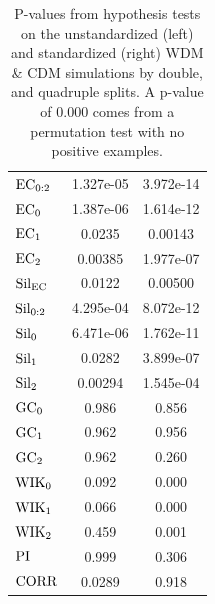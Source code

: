 \documentclass[12pt]{article}
\begin{document}
\begin{table}[htp!]
\begin{center}
\begin{tabular}{ l | c |  c }
          $\textup{EC}_{0:2}$ & 1.327e-05 &  3.972e-14 \\
          $\textup{EC}_{0}$ & 1.387e-06 & 1.614e-12 \\
          $\textup{EC}_{1}$ & 0.0235 & 0.00143 \\
          $\textup{EC}_{2}$ & 0.00385 & 1.977e-07 \\
          \midrule
          $\textup{Sil}_{\textup{EC}}$ & 0.0122 & 0.00500 \\
          $\textup{Sil}_{0:2}$ & 4.295e-04 & 8.072e-12 \\
          $\textup{Sil}_{0}$ & 6.471e-06 & 1.762e-11 \\
          $\textup{Sil}_{1}$ & 0.0282 & 3.899e-07 \\
          $\textup{Sil}_{2}$ & 0.00294 & 1.545e-04 \\
          \midrule
          $\textup{GC}_{0}$ & 0.986 & 0.856 \\
          $\textup{GC}_{1}$ & 0.962 & 0.956 \\
          $\textup{GC}_{2}$ & 0.962 & 0.260 \\
          \midrule
          $\textup{WIK}_{0}$ & 0.092 & 0.000 \\
          $\textup{WIK}_{1}$ & 0.066 & 0.000 \\
          $\textup{WIK}_{2}$ & 0.459 & 0.001 \\
          $\textup{PI}$ & 0.999 & 0.306 \\
          \midrule
          $\textup{CORR}$ & 0.0289 & 0.918 \\
          \bottomrule
        \end{tabular}
    \end{center}
\caption{P-values from hypothesis tests on the unstandardized (left) and standardized (right) WDM \& CDM simulations by double, and quadruple splits. A p-value of $0.000$ comes from a permutation test with no positive examples.}
\label{table:hypoCDMWDMresults}
\end{table}
\end{document}
